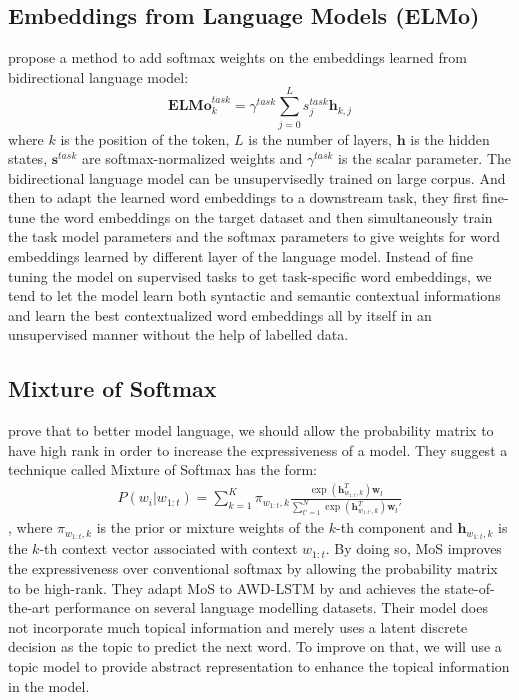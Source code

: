 \documentclass[11pt,a4paper]{article}
\begin{document}
\subsection{Embeddings from Language Models (ELMo)\citep{peters2018deep}}
\label{subsec:elmo}
\citet{peters2018deep} propose a method to add softmax weights on the embeddings learned from bidirectional language model:
\begin{equation}
\mathbf{ELMo}_k^{task}
= \gamma^{task}\sum\limits_{j=0}^L s_j^{task}\mathbf{h}_{k,j}
\end{equation}
where $k$ is the position of the token, $L$ is the number of layers, $\mathbf{h}$ is the hidden states, $\mathbf{s}^{task}$ are softmax-normalized weights and $\gamma^{task}$ is the scalar parameter. The bidirectional language model can be unsupervisedly trained on large corpus. And then to adapt the learned word embeddings to a downstream task, they first fine-tune the word embeddings on the target dataset and then simultaneously train the task model parameters and the softmax parameters to give weights for word embeddings learned by different layer of the language model. Instead of fine tuning the model on supervised tasks to get task-specific word embeddings, we tend to let the model learn both syntactic and semantic contextual informations and learn the best contextualized word embeddings all by itself in an unsupervised manner without the help of labelled data.

\subsection{Mixture of Softmax \citep{yang2017breaking}}
\label{subsec:mos}
\citet{yang2017breaking} prove that to better model language, we should allow the probability matrix to have high rank in order to increase the expressiveness of a model. They suggest a technique called Mixture of Softmax has the form: \\
\begin{align}
P(w_i|w_{1:t}) = \sum\limits_{k=1}^K \pi_{w_{1:t},k}\frac{\exp(\mathbf{h}_{w_{1:t}, k}^T)\mathbf{w}_t}{\sum\limits_{t'=1}^N \exp(\mathbf{h}_{w_{1:t'}, k}^T)\mathbf{w}_t'}
\end{align}
, where $\pi_{w_{1:t},k}$ is the prior or mixture weights of the $k$-th component and $\mathbf{h}_{w_{1:t}, k}$ is the $k$-th context vector associated with context $w_{1:t}$. By doing so, MoS improves the expressiveness over conventional softmax by allowing the probability matrix to be high-rank. They adapt MoS to AWD-LSTM by \citet{merity2017regularizing} and achieves the state-of-the-art performance on several language modelling datasets. Their model does not  incorporate much topical information and merely uses a latent discrete decision as the topic to predict the next word. To improve on that, we will use a topic model to provide abstract representation to enhance the topical information in the model.
\end{document}
